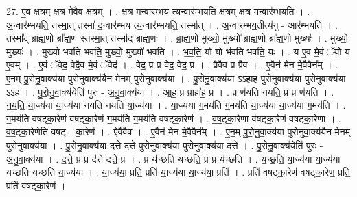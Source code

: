 \documentclass[17pt]{extarticle}
\begin{document}
27. ए॒व क्ष॒त्रम् क्ष॒त्र मे॒वैव क्ष॒त्रम् । . क्ष॒त्र म॒न्वार॑म्भय त्य॒न्वार॑म्भयति क्ष॒त्रम् क्ष॒त्र म॒न्वार॑म्भयति । . अ॒न्वार॑म्भयति॒ तस्मा॒त् तस्मा॑ द॒न्वार॑म्भय त्य॒न्वार॑म्भयति॒ तस्मा᳚त् । . अ॒न्वार॑म्भय॒तीत्य॑नु - आर॑म्भयति । . तस्मा᳚द् ब्राह्म॒णो ब्रा᳚ह्म॒ण स्तस्मा॒त् तस्मा᳚द् ब्राह्म॒णः । . ब्रा॒ह्म॒णो मुख्यो॒ मुख्यो᳚ ब्राह्म॒णो ब्रा᳚ह्म॒णो मुख्यः॑ । . मुख्यो॒ मुख्यः॑ । . मुख्यो॑ भवति भवति॒ मुख्यो॒ मुख्यो॑ भवति । . भ॒व॒ति॒ यो यो भ॑वति भवति॒ यः । . य ए॒व मे॒वं ॅयो य ए॒वम् । . ए॒वं ॅवेद॒ वेदै॒व मे॒वं ॅवेद॑ । . वेद॒ प्र प्र वेद॒ वेद॒ प्र । . प्रैवैव प्र प्रैव । . ए॒वैन॑ मेन मे॒वैवैन᳚म् । . ए॒न॒म् पु॒रो॒नु॒वा॒क्य॑या पुरोनुवा॒क्य॑यैन मेनम् पुरोनुवा॒क्य॑या । . पु॒रो॒नु॒वा॒क्य॑या ऽऽहाह पुरोनुवा॒क्य॑या पुरोनुवा॒क्य॑या ऽऽह । . पु॒रो॒नु॒वा॒क्य॑येति॑ पुरः - अ॒नु॒वा॒क्य॑या । . आ॒ह॒ प्र प्राहा॑ह॒ प्र । . प्र ण॑यति नयति॒ प्र प्र ण॑यति । . न॒य॒ति॒ या॒ज्य॑या या॒ज्य॑या नयति नयति या॒ज्य॑या । . या॒ज्य॑या ग॒मय॑ति ग॒मय॑ति या॒ज्य॑या या॒ज्य॑या ग॒मय॑ति । . ग॒मय॑ति वषट्का॒रेण॑ वषट्का॒रेण॑ ग॒मय॑ति ग॒मय॑ति वषट्का॒रेण॑ । . व॒ष॒ट्का॒रेणा व॑षट्का॒रेण॑ वषट्का॒रेणा । . व॒ष॒ट्का॒रेणेति॑ वषट् - का॒रेण॑ । . ऐवैवैव । . ए॒वैन॑ मेन मे॒वैवैन᳚म् । . ए॒न॒म् पु॒रो॒नु॒वा॒क्य॑या पुरोनुवा॒क्य॑यैन मेनम् पुरोनुवा॒क्य॑या । . पु॒रो॒नु॒वा॒क्य॑या दत्ते दत्ते पुरोनुवा॒क्य॑या पुरोनुवा॒क्य॑या दत्ते । . पु॒रो॒नु॒वा॒क्य॑येति॑ पुरः - अ॒नु॒वा॒क्य॑या । . द॒त्ते॒ प्र प्र द॑त्ते दत्ते॒ प्र । . प्र य॑च्छति यच्छति॒ प्र प्र य॑च्छति । . य॒च्छ॒ति॒ या॒ज्य॑या या॒ज्य॑या यच्छति यच्छति या॒ज्य॑या । . या॒ज्य॑या॒ प्रति॒ प्रति॑ या॒ज्य॑या या॒ज्य॑या॒ प्रति॑ । . प्रति॑ वषट्का॒रेण॑ वषट्का॒रेण॒ प्रति॒ प्रति॑ वषट्का॒रेण॑ । \newline
\end{document}
